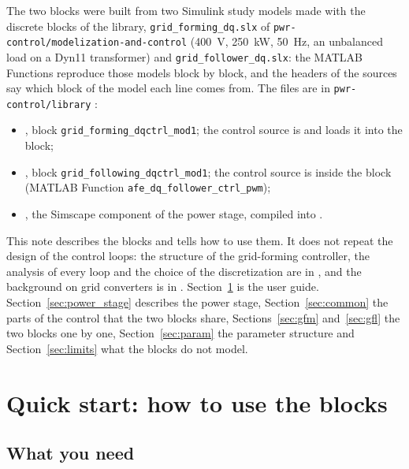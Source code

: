 \documentclass[11pt,a4paper]{scrartcl}
\newcommand{\code}[1]{\texttt{#1}}
\begin{document}
\begin{onehalfspace}
The two blocks were built from two Simulink study models made with the discrete blocks of the library, \code{grid\_forming\_dq.slx} of \code{pwr-control/modelization-and-control} (\SI{400}{\volt}, \SI{250}{\kilo\watt}, \SI{50}{\hertz}, an unbalanced load on a Dyn11 transformer) and \code{grid\_follower\_dq.slx}: the MATLAB Functions reproduce those models block by block, and the headers of the sources say which block of the model each line comes from. The files are in \code{pwr-control/library} \cite{library_repo}:

\begin{itemize}[nosep]
	\item {}, block \code{grid\_forming\_dqctrl\_mod1}; the control source is  and  loads it into the block;
	\item {}, block \code{grid\_following\_dqctrl\_mod1}; the control source is inside the block (MATLAB Function \code{afe\_dq\_follower\_ctrl\_pwm});
	\item {}, the Simscape component of the power stage, compiled into .
\end{itemize}

This note describes the blocks and tells how to use them. It does not repeat the design of the control loops: the structure of the grid-forming controller, the analysis of every loop and the choice of the discretization are in \cite{gfm_note}, and the background on grid converters is in \cite{teodorescu2011}. Section~\ref{sec:quickstart} is the user guide. Section~\ref{sec:power_stage} describes the power stage, Section~\ref{sec:common} the parts of the control that the two blocks share, Sections~\ref{sec:gfm} and~\ref{sec:gfl} the two blocks one by one, Section~\ref{sec:param} the parameter structure and Section~\ref{sec:limits} what the blocks do not model.

\section{Quick start: how to use the blocks}
\label{sec:quickstart}

\subsection{What you need}
\label{sec:need}


\end{onehalfspace}
\end{document}
